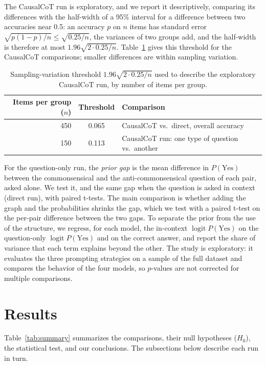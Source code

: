 \documentclass{llncs}
\begin{document}
The CausalCoT run is exploratory, and we report it descriptively, comparing its differences with the half-width of a 95\% interval for a difference between two accuracies near 0.5: an accuracy $p$ on $n$ items has standard error $\sqrt{p(1-p)/n} \leq \sqrt{0.25/n}$, the variances of two groups add, and the half-width is therefore at most $1.96\sqrt{2 \cdot 0.25/n}$. Table~\ref{tab:threshold} gives this threshold for the CausalCoT comparisons; smaller differences are within sampling variation.

\begin{table}[!htbp]
\centering
\caption{Sampling-variation threshold $1.96\sqrt{2 \cdot 0.25/n}$ used to describe the exploratory CausalCoT run, by number of items per group.}
\label{tab:threshold}
\scriptsize
\setlength{\tabcolsep}{8pt}
\begin{tabular}{rcl}
\toprule
Items per group ($n$) & Threshold & Comparison \\
\midrule
450 & 0.065 & CausalCoT vs.\ direct, overall accuracy \\
150 & 0.113 & CausalCoT run: one type of question vs.\ another \\
\bottomrule
\end{tabular}
\end{table}

For the question-only run, the \emph{prior gap} is the mean difference in $P(\text{Yes})$ between the commonsensical and the anti-commonsensical question of each pair, asked alone. We test it, and the same gap when the question is asked in context (direct run), with paired t-tests. The main comparison is whether adding the graph and the probabilities shrinks the gap, which we test with a paired t-test on the per-pair difference between the two gaps. To separate the prior from the use of the structure, we regress, for each model, the in-context $\operatorname{logit} P(\text{Yes})$ on the question-only $\operatorname{logit} P(\text{Yes})$ and on the correct answer, and report the share of variance that each term explains beyond the other. The study is exploratory: it evaluates the three prompting strategies on a sample of the full dataset and compares the behavior of the four models, so $p$-values are not corrected for multiple comparisons.

\section{Results}
\label{sec:results}

Table~\ref{tab:summary} summarizes the comparisons, their null hypotheses ($H_0$), the statistical test, and our conclusions. The subsections below describe each run in turn.
\end{document}
